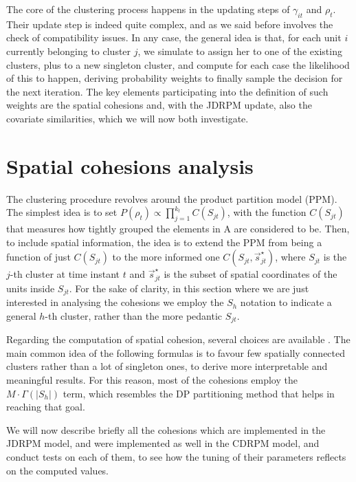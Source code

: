 \documentclass[12pt,	%
	a4paper,		%
	twoside,		%
	openright,		%
	titlepage,%
	]{book}
\theoremstyle{definition}
\begin{document}
The core of the clustering process happens in the updating steps of $\gamma_{it}$ and $\rho_t$. Their update step is indeed quite complex, and as we said before involves the check of compatibility issues. In any case, the general idea is that, for each unit $i$ currently belonging to cluster $j$, we simulate to assign her to one of the existing clusters, plus to a new singleton cluster, and compute for each case the likelihood of this to happen, deriving probability weights to finally sample the decision for the next iteration. The key elements participating into the definition of such weights are the spatial cohesions and, with the JDRPM update, also the covariate similarities, which we will now both investigate. 

\section{Spatial cohesions analysis}
\label{Spatial cohesion analysis}


The clustering procedure revolves around the product partition model (PPM). The simplest idea is to set $P(\rho_t) \propto \prod_{j=1}^{k_t} C(S_{jt})$, with the function $C(S_{jt})$ that measures how tightly grouped the elements in A are considered to be. Then, to include spatial information, the idea is to extend the PPM from being a function of just $C(S_{jt})$ to the more informed one $C(S_{jt},\vec{s}_{jt}^\star)$, where $S_{jt}$ is the $j$-th cluster at time instant $t$ and $\vec{s}_{jt}^\star$ is the subset of spatial coordinates of the units inside $S_{jt}$. For the sake of clarity, in this section where we are just interested in analysing the cohesions we employ the $S_h$ notation to indicate a general $h$-th cluster, rather than the more pedantic $S_{jt}$.

Regarding the computation of spatial cohesion, several choices are available \cite{paper3}. The main common idea of the following formulas is to favour few spatially connected clusters rather than a lot of singleton ones, to derive more interpretable and meaningful results. For this reason, most of the cohesions employ the $M\cdot \Gamma(|S_h|)$ term, which resembles the DP partitioning method that helps in reaching that goal.

We will now describe briefly all the cohesions which are implemented in the JDRPM model, and were implemented as well in the CDRPM model, and conduct tests on each of them, to see how the tuning of their parameters reflects on the computed values. 
\end{document}
